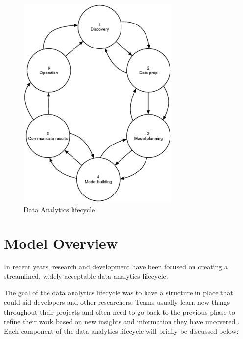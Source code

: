 \begin{figure}[htbp]
\centering
\includegraphics[width=8cm]{./figures/datalifecycle.eps}
\caption{Data Analytics lifecycle \protect\cite{STOREY201750}}
\label{fig:lifecycle}
\end{figure}

\section{Model Overview}

In recent years, research and development have been focused on creating a streamlined, widely acceptable data analytics lifecycle.

The goal of the data analytics lifecycle was to have a structure in place that could aid developers and other researchers. Teams usually learn new things throughout their projects and often need to go back to the previous phase to refine their work based on new insights and information they have uncovered \cite{dietrich2015data}. 
Each component of the data analytics lifecycle will briefly be discussed below:

